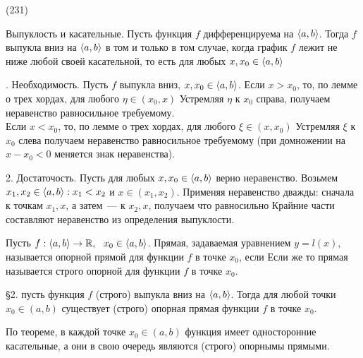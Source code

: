 (231)

\T \q Выпуклость и касательные. Пусть функция $f$ дифференцируема на $\langle a, b \rangle$. Тогда $f$ выпукла вниз на $\langle a, b \rangle$ в том и только в том случае, когда график $f$ лежит не ниже любой своей касательной, то есть для любых $x, x_0 \in \langle a, b \rangle$ 

. Необходимость. Пусть $f$ выпукла вниз, $x, x_0 \in \langle a, b \rangle$. Если $x > x_0$, то, по лемме о трех хордах, для любого $\eta \in (x_0, x)$  Устремляя $\eta$ к $x_0$ справа, получаем неравенство  равносильное требуемому.\\
Если $x < x_0$, то, по лемме о трех хордах, для любого $\xi \in (x, x_0)$  Устремляя $\xi$ к $x_0$ слева получаем неравенство  равносильное требуемому (при домножении на $x - x_0 < 0$ меняется знак неравенства).

2. Достаточость. Пусть для любых $x, x_0 \in \langle a, b \rangle$ верно неравенство. Возьмем $x_1, x_2 \in \langle a, b \rangle: x_1 < x_2$ и $x \in (x_1, x_2)$. Применяя неравенство дважды: сначала к точкам $x_1, x$, а затем~--- к $x_2, x$, получаем  что равносильно  Крайние части составляют неравенство из определения выпуклости.

\Op Пусть $f: \langle a, b \rangle\to \mathbb{R},\ \  x_0 \in \langle a, b \rangle$. Прямая, задаваемая уравнением $y = l(x)$, называется опорной прямой для функции $f$ в точке $x_0$, если  Если же  то прямая называется строго опорной для функции $f$ в точке $x_0$.

\S2. пусть функция $f$ (строго) выпукла вниз на $\langle a, b \rangle$. Тогда для любой точки $x_0 \in (a, b)$ существует (строго) опорная прямая функции $f$ в точке $x_0$.

\D По теореме, в каждой точке $x_0 \in (a, b)$ функция имеет односторонние касательные, а они в свою очередь являются (строго) опорнымы прямыми.